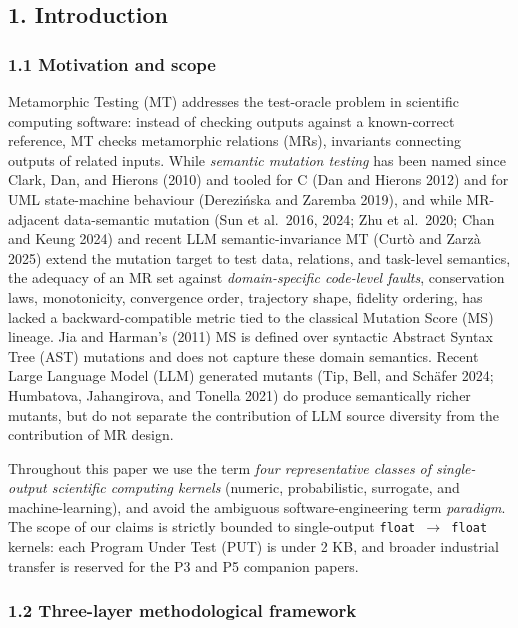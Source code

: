 \documentclass[review,12pt,authoryear]{elsarticle}
\begin{document}
\subsection{1. Introduction}\label{introduction}

\subsubsection{1.1 Motivation and scope}\label{motivation-and-scope}

Metamorphic Testing (MT) addresses the test-oracle problem in scientific
computing software: instead of checking outputs against a known-correct
reference, MT checks metamorphic relations (MRs), invariants connecting
outputs of related inputs. While \emph{semantic mutation testing} has
been named since Clark, Dan, and Hierons (2010) and tooled for C (Dan
and Hierons 2012) and for UML state-machine behaviour (Derezińska and
Zaremba 2019), and while MR-adjacent data-semantic mutation (Sun et
al.~2016, 2024; Zhu et al.~2020; Chan and Keung 2024) and recent LLM
semantic-invariance MT (Curtò and Zarzà 2025) extend the mutation target
to test data, relations, and task-level semantics, the adequacy of an MR
set against \emph{domain-specific code-level faults}, conservation laws,
monotonicity, convergence order, trajectory shape, fidelity ordering,
has lacked a backward-compatible metric tied to the classical Mutation
Score (MS) lineage. Jia and Harman's (2011) MS is defined over syntactic
Abstract Syntax Tree (AST) mutations and does not capture these domain
semantics. Recent Large Language Model (LLM) generated mutants (Tip,
Bell, and Schäfer 2024; Humbatova, Jahangirova, and Tonella 2021) do
produce semantically richer mutants, but do not separate the
contribution of LLM source diversity from the contribution of MR design.

Throughout this paper we use the term \emph{four representative classes
of single-output scientific computing kernels} (numeric, probabilistic,
surrogate, and machine-learning), and avoid the ambiguous
software-engineering term \emph{paradigm}. The scope of our claims is
strictly bounded to single-output \texttt{float\ $\to$\ float} kernels: each
Program Under Test (PUT) is under 2 KB, and broader industrial transfer
is reserved for the P3 and P5 companion papers.

\subsubsection{1.2 Three-layer methodological framework}\label{three-layer-methodological-framework}
\end{document}
